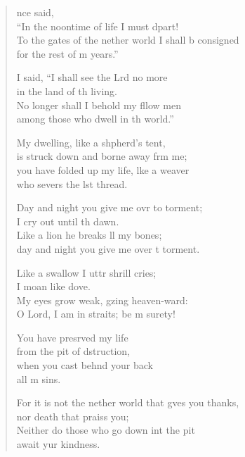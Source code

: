 \settowidth{\versewidth}{To the gates of the nether world I shall be consigned *}
\begin{verse}%
  \begin{patverse}
    nce  said,\Med\\
“In the noontime of life I must dpart!\\
To the gates of the nether world I shall b consigned\Med\\
for the rest of m years.”

I said, “I shall see the Lrd no more\Med\\
in the land of th living.\\
No longer shall I behold my fllow men\Med\\
among those who dwell in th world.”

My dwelling, like a shpherd’s tent,\Med\\
is struck down and borne away frm me;\\
you have folded up my life, l\pointup{\i}ke a weaver\Med\\
who severs the lst thread.

Day and night you give me ovr to torment;\Med\\
I cry out until th dawn.\\
Like a lion he breaks ll my bones;\Med\\
day and night you give me over t torment.

Like a swallow I uttr shrill cries;\Med\\
I moan like  dove.\\
My eyes grow weak, gzing heaven-ward:\Med\\
O Lord, I am in straits; be m surety!

You have presrved my life\Med\\
from the pit of dstruction,\\
when you cast beh\pointup{\i}nd your back\Med\\
all m sins.

For it is not the nether world that g\pointup{\i}ves you thanks,\Med\\
nor death that praiss you;\\
Neither do those who go down int the pit\Med\\
await yur kindness.


\end{patverse}
\end{verse}
